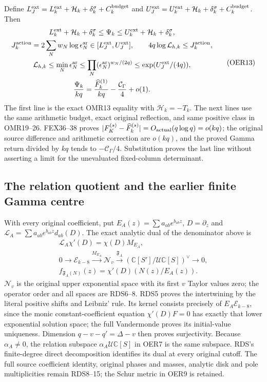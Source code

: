 \documentclass[11pt,a4paper]{article}
\begin{document}
Define $L_J^{\rm ext}=L_k^{\rm ext}+\mathcal H_k
+\delta_k^\sigma+C_k^{\rm budget}$ and
$U_J^{\rm ext}=U_k^{\rm ext}+\mathcal H_k
+\delta_k^\sigma+C_k^{\rm budget}$. Then
\[
\begin{gathered}
 L_k^{\rm ext}+\mathcal H_k+\delta_k^\sigma
 \le\Psi_k\le U_k^{\rm ext}+\mathcal H_k+\delta_k^\sigma,\\
 J_k^{\rm action}=2\sum_Nw_N\log\epsilon_N^{\rm ar}
   \in[L_J^{\rm ext},U_J^{\rm ext}],\qquad
 4q\log\mathcal L_{h,k}\le J_k^{\rm action},\\
 \mathcal L_{h,k}\le\min_N\epsilon_N^{\rm ar}
 \le\prod_N(\epsilon_N^{\rm ar})^{w_N/(2q)}
 \le\exp(U_J^{\rm ext}/(4q)),\\
 \frac{\Psi_k}{kq}
 =\frac{\widehat F_k^{(1)}}{kq}-\frac{\mathcal C_\Gamma}{4}+o(1).
\end{gathered}\tag{OER13}
\]
The first line is the exact OMR13 equality with $\mathcal H_k=-T_k$.
The next lines use the same arithmetic budget, exact original
reflection, and same positive class in OMR19--26.
FEX36--38 proves $|F_K^{(s)}-\widehat F_k^{(s)}|
=O_{\rm actual}(q\log q)=o(kq)$; the original source difference
and arithmetic correction are $o(kq)$, and the proved Gamma
return divided by $kq$ tends to $-\mathcal C_\Gamma/4$.
Substitution proves the last line without asserting a limit
for the unevaluated fixed-column determinant.

\subsection{The relation quotient and the earlier finite Gamma centre}

With every original coefficient, put
$E_A(z)=\sum a_{ab}e^{b_{ab}z}$, $D=\partial_z$ and
$\mathscr L_A=\sum a_{ab}e^{b_{ab}z}d_{ab}(D)$.
The exact analytic dual of the denominator above is
\[
\begin{gathered}
 \mathscr L_A\chi'(D)=\chi(D)M_{E_A},\\
 0\longrightarrow\mathscr E_{k-8}
   \xrightarrow{M_{E_A}}\mathscr N_v
   \xrightarrow{\mathfrak F_A}
      (\mathbb C[S']/\mathcal U\mathbb C[S])^\vee
   \longrightarrow0,\\
 f_{\mathfrak F_A(N)}(z)=\chi'(D)(N(z)/E_A(z)).
\end{gathered}\tag{OER14}
\]
$\mathscr N_v$ is the original upper exponential space with its
first $v$ Taylor values zero; the operator order and all spaces
are RDS6--8. RDS5 proves the intertwining by the literal
positive shifts and Leibniz' rule. Its kernel consists precisely
of $E_A\mathscr E_{k-8}$, since the monic constant-coefficient
equation $\chi'(D)F=0$ has exactly that lower exponential
solution space; the full Vandermonde proves its initial-value
uniqueness. Dimension $q-v-q'=\Delta-v$ then proves surjectivity.
Because $\alpha_A\ne0$, the relation subspace
$\alpha_A\mathcal U\mathbb C[S]$ in OER7 is the same subspace.
RDS's finite-degree direct decomposition identifies its dual
at every original cutoff. The full source coefficient identity,
original phases and masses, analytic disk and pole multiplicities
remain RDS8--15; the Schur metric in OER9 is retained.
\end{document}

